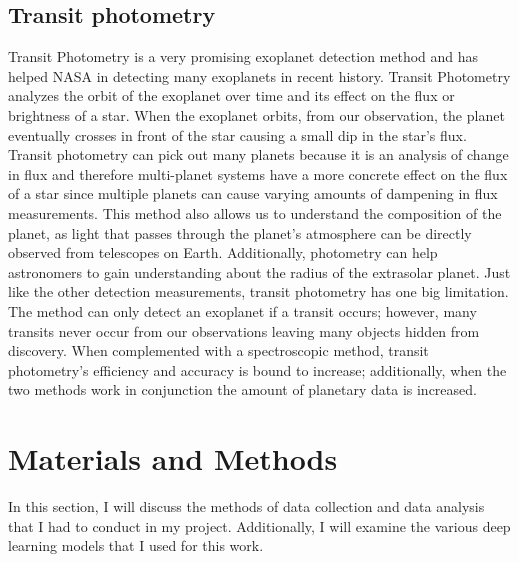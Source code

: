 \documentclass[12pt]{article}
\begin{document}
\subsection{Transit photometry}
\label{subsec:transitp}
Transit Photometry is a very promising exoplanet detection method and has helped NASA in detecting many exoplanets in recent history. Transit Photometry analyzes the orbit of the exoplanet over time and its effect on the flux or brightness of a star. When the exoplanet orbits, from our observation, the planet eventually crosses in front of the star causing a small dip in the star’s flux. Transit photometry can pick out many planets because it is an analysis of change in flux and therefore multi-planet systems have a more concrete effect on the flux of a star since multiple planets can cause varying amounts of dampening in flux measurements. This method also allows us to understand the composition of the planet, as light that passes through the planet's atmosphere can be directly observed from telescopes on Earth. Additionally, photometry can help astronomers to gain understanding about the radius of the extrasolar planet. Just like the other detection measurements, transit photometry has one big limitation. The method can only detect an exoplanet if a transit occurs; however, many transits never occur from our observations leaving many objects hidden from discovery. When complemented with a spectroscopic method, transit photometry’s efficiency and accuracy is bound to increase; additionally, when the two methods work in conjunction the amount of planetary data is increased. 
\section{Materials and Methods}
\label{sec:matmet}
In this section, I will discuss the methods of data collection and data analysis that I had to conduct in my project. Additionally, I will examine the various deep learning models that I used for this work.
\end{document}

